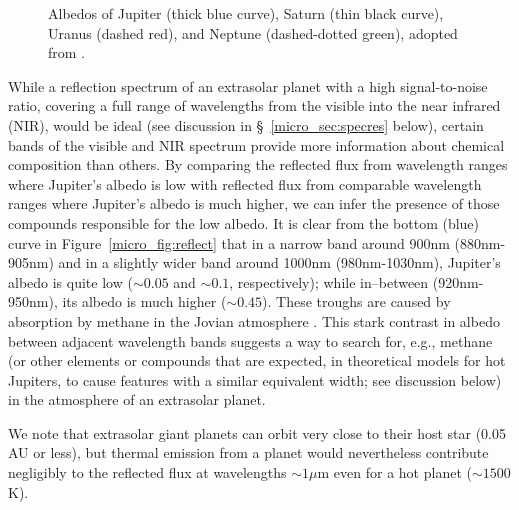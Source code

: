 \begin{figure}[p]
\caption[Wavelength-dependent albedos of giant planets.]{Albedos of
Jupiter (thick blue curve), Saturn (thin black curve), Uranus (dashed
red), and Neptune (dashed-dotted green), adopted from
\citet{karkoschka1994}.}
\label{micro_fig:albedos} 
\end{figure}
\afterpage{\clearpage}

While a reflection spectrum of an extrasolar planet with a high
signal-to-noise ratio, covering a full range of wavelengths from the
visible into the near infrared (NIR), would be ideal (see discussion
in \S~\ref{micro_sec:specres} below), certain bands of the visible and NIR
spectrum provide more information about chemical composition than
others.  By comparing the reflected flux from wavelength ranges where
Jupiter's albedo is low with reflected flux from comparable wavelength
ranges where Jupiter's albedo is much higher, we can infer the
presence of those compounds responsible for the low albedo.  It is
clear from the bottom (blue) curve in Figure~\ref{micro_fig:reflect} that in
a narrow band around 900nm (880nm-905nm) and in a slightly wider band
around 1000nm (980nm-1030nm), Jupiter's albedo is quite low ($\sim
0.05$ and $\sim 0.1$, respectively); while in--between (920nm-950nm),
its albedo is much higher ($\sim 0.45$).  These troughs are caused by
absorption by methane in the Jovian atmosphere \citep{karkoschka1994}.
This stark contrast in albedo between adjacent wavelength bands
suggests a way to search for, e.g., methane (or other elements or
compounds that are expected, in theoretical models for hot Jupiters,
to cause features with a similar equivalent width; see discussion
below) in the atmosphere of an extrasolar planet.

We note that extrasolar giant planets can orbit very close to their
host star (0.05 AU or less), but thermal emission from a planet would
nevertheless contribute negligibly to the reflected flux at
wavelengths $\sim1\mu$m even for a hot planet ($\sim 1500$K).


